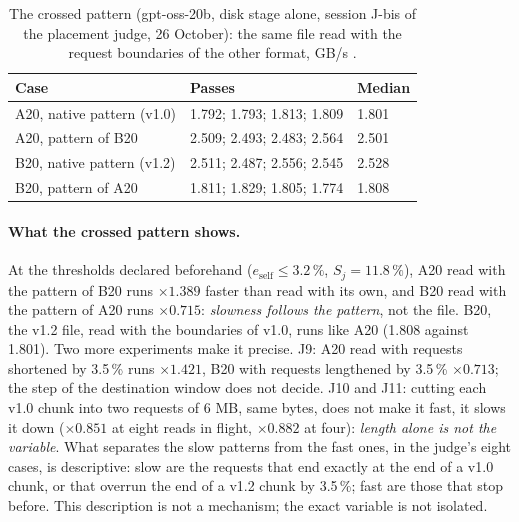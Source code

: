 \begin{table}[ht]
\centering\small
\caption[The crossed pattern]{The crossed pattern (gpt-oss-20b, disk stage alone, session J-bis of the placement judge, 26 October): the same file read with the request boundaries of the other format, GB/s \mes.}
\label{t3cod:tab:motif}
\begin{tabular}{@{}lll@{}}
\toprule
Case & Passes & Median \\
\midrule
A20, native pattern (v1.0) & 1.792; 1.793; 1.813; 1.809 & 1.801 \\
A20, pattern of B20 & 2.509; 2.493; 2.483; 2.564 & 2.501 \\
B20, native pattern (v1.2) & 2.511; 2.487; 2.556; 2.545 & 2.528 \\
B20, pattern of A20 & 1.811; 1.829; 1.805; 1.774 & 1.808 \\
\bottomrule
\end{tabular}
\end{table}

\paragraph{What the crossed pattern shows.} At the thresholds declared beforehand ($e_{\text{self}} \le 3.2\,\%$, $S_j = 11.8\,\%$), A20 read with the pattern of B20 runs $\times 1.389$ faster than read with its own, and B20 read with the pattern of A20 runs $\times 0.715$: \emph{slowness follows the pattern}, not the file. B20, the v1.2 file, read with the boundaries of v1.0, runs like A20 (1.808 against 1.801). Two more experiments make it precise. J9: A20 read with requests shortened by 3.5\,\% runs $\times 1.421$, B20 with requests lengthened by 3.5\,\% $\times 0.713$; the step of the destination window does not decide. J10 and J11: cutting each v1.0 chunk into two requests of 6 MB, same bytes, does not make it fast, it slows it down ($\times 0.851$ at eight reads in flight, $\times 0.882$ at four): \emph{length alone is not the variable}. What separates the slow patterns from the fast ones, in the judge's eight cases, is descriptive: slow are the requests that end exactly at the end of a v1.0 chunk, or that overrun the end of a v1.2 chunk by 3.5\,\%; fast are those that stop before. This description is not a mechanism; the exact variable is not isolated.

\begin{figure}[tbp]
\centering
\GrapheCodonJalonBis
{}
\label{fig:t3-codon-jalon-bis}
\end{figure}


